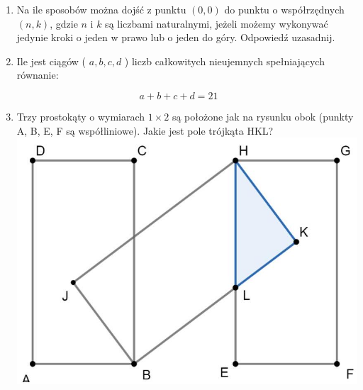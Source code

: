 \documentclass[10pt]{article}
\begin{document}
\begin{enumerate}
  \item Na ile sposobów można dojść z punktu \((0,0)\) do punktu o współrzędnych \((n, k)\), gdzie \(n\) i \(k\) są liczbami naturalnymi, jeżeli możemy wykonywać jedynie kroki o jeden w prawo lub o jeden do góry. Odpowiedź uzasadnij.
  \item Ile jest ciągów ( \(a, b, c, d\) ) liczb całkowitych nieujemnych spełniających równanie:
\end{enumerate}

\[
a+b+c+d=21
\]

\begin{enumerate}
  \setcounter{enumi}{2}
  \item Trzy prostokąty o wymiarach \(1 \times 2\) są położone jak na rysunku obok (punkty A, B, E, F są współliniowe). Jakie jest pole trójkąta HKL?\\
\includegraphics[max width=\textwidth, center]{2024_11_21_59abd5fb4069b0a9805eg-1}
\end{enumerate}
\end{document}

